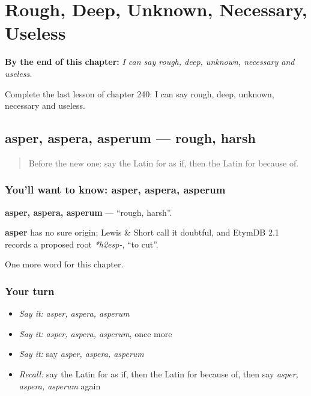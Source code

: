 
\chapter{Rough, Deep, Unknown, Necessary, Useless}
\label{ch:la-rough-deep-unknown-necessary-useless}

\begin{chapteropening}
\textbf{By the end of this chapter:} \emph{I can say rough, deep, unknown, necessary and useless.}

Complete the last lesson of chapter 240: I can say rough, deep, unknown, necessary and useless.
\end{chapteropening}

\section[asper, aspera, asperum]{asper, aspera, asperum — rough, harsh}

\label{lesson:LA-C240-asper}



\begin{quote}
Before the new one: say the Latin for as if, then the Latin for because of.
\end{quote}

\subsection*{You'll want to know: asper, aspera, asperum}
\textbf{asper, aspera, asperum} — \textquotedblleft{}rough, harsh\textquotedblright{}.

\begin{cousinweb}
\textbf{asper} has no sure origin; Lewis \& Short call it doubtful, and EtymDB 2.1 records a proposed root \emph{*h2esp-}, \textquotedblleft{}to cut\textquotedblright{}.
\end{cousinweb}

\begin{grammarlens}[title={What you've built}]
One more word for this chapter.
\end{grammarlens}

\subsection*{Your turn}
\begin{itemize}
\raggedright
  \item \emph{Say it:} \emph{asper, aspera, asperum}
  \item \emph{Say it:} \emph{asper, aspera, asperum}, once more
  \item \emph{Say it:} say \emph{asper, aspera, asperum}
  \item \emph{Recall:} say the Latin for as if, then the Latin for because of, then say \emph{asper, aspera, asperum} again
\end{itemize}

